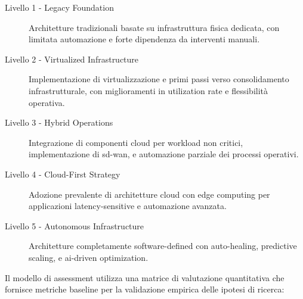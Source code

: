 \begin{description}
    \item[Livello 1 - Legacy Foundation] Architetture tradizionali basate su infrastruttura fisica dedicata, con limitata automazione e forte dipendenza da interventi manuali.
    
    \item[Livello 2 - Virtualized Infrastructure] Implementazione di virtualizzazione e primi passi verso consolidamento infrastrutturale, con miglioramenti in utilization rate e flessibilità operativa.
    
    \item[Livello 3 - Hybrid Operations] Integrazione di componenti cloud per workload non critici, implementazione di \gls{sd-wan}, e automazione parziale dei processi operativi.
    
    \item[Livello 4 - Cloud-First Strategy] Adozione prevalente di architetture cloud con edge computing per applicazioni latency-sensitive e automazione avanzata.
    
    \item[Livello 5 - Autonomous Infrastructure] Architetture completamente software-defined con auto-healing, predictive scaling, e \gls{ai}-driven optimization.
\end{description}

Il modello di assessment utilizza una matrice di valutazione quantitativa che fornisce metriche baseline per la validazione empirica delle ipotesi di ricerca:

